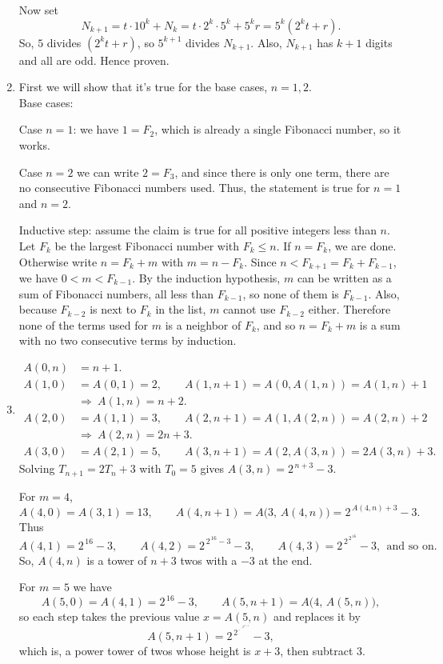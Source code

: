 \documentclass[12pt]{article}
\begin{document}
\begin{enumerate}
Now set
\[
N_{k+1}=t\cdot 10^k+N_k=t\cdot 2^k\cdot 5^k+5^k r=5^k(2^k t+r).
\]
So, $5$ divides $(2^k t+r)$, so $5^{k+1}$ divides $N_{k+1}$.
Also, $N_{k+1}$ has $k+1$ digits and all are odd. Hence proven.

\item First we will show that it's true for the base cases, $n =1,2$.\\
Base cases: 

Case $n = 1$: we have $1 = F_2$, which is already a single Fibonacci number, so it works.

Case $n = 2$ we can write $2 = F_3$, and since there is only one term, there are no consecutive Fibonacci numbers used. Thus, the statement is true for $n = 1$ and $n = 2$.

Inductive step: assume the claim is true for all positive integers less than $n$.
Let $F_k$ be the largest Fibonacci number with $F_k\le n$.
If $n=F_k$, we are done.
Otherwise write $n=F_k+m$ with $m=n-F_k$.
Since $n<F_{k+1}=F_k+F_{k-1}$, we have $0<m<F_{k-1}$.
By the induction hypothesis, $m$ can be written as a sum of Fibonacci numbers,
all less than $F_{k-1}$, so none of them is $F_{k-1}$.
Also, because $F_{k-2}$ is next to $F_k$ in the list, $m$ cannot use $F_{k-2}$ either.
Therefore none of the terms used for $m$ is a neighbor of $F_k$,
and so $n=F_k+m$ is a sum with no two consecutive terms by induction.


\item 
\[
\begin{aligned}
A(0,n)&=n+1.\\[4pt]
A(1,0)&=A(0,1)=2,\qquad A(1,n+1)=A(0,A(1,n))=A(1,n)+1\\
&\Rightarrow\ A(1,n)=n+2.\\[4pt]
A(2,0)&=A(1,1)=3,\qquad A(2, n+1)=A(1, A(2,n))=A(2,n)+2\\
&\Rightarrow\ A(2,n)=2n+3.\\[4pt]
A(3,0)&=A(2,1)=5,\qquad A(3,n+1)=A(2,A(3,n))=2A(3,n)+3.
\end{aligned}
\]
Solving $T_{n+1}=2T_n+3$ with $T_0=5$ gives $A(3,n)=2^{\,n+3}-3$.

For $m=4$,
\[
A(4,0)=A(3,1)=13,\qquad A(4,n+1)=A\bigl(3,\,A(4,n)\bigr)=2^{\,A(4,n)+3}-3.
\]
Thus
\[
A(4,1)=2^{\,16}-3,\qquad
A(4,2)=2^{\,2^{\,16}-3}-3,\qquad
A(4,3)=2^{\,2^{\,2^{\,16}}}-3,\ \ \text{and so on.}
\]
So, $A(4,n)$ is a tower of $n+3$ twos with a $-3$ at the end.

For $m=5$ we have
\[
A(5,0)=A(4,1)=2^{\,16}-3,\qquad A(5,n+1)=A\bigl(4,\,A(5,n)\bigr),
\]
so each step takes the previous value $x=A(5,n)$ and replaces it by
\[
A(5,n+1)=2^{\,2^{\,\cdot^{\,\cdot^{\,2^{\,x+3}}}}}-3,
\]
which is, a power tower of twos whose height is $x+3$, then subtract $3$.



\end{enumerate}
\end{document}

